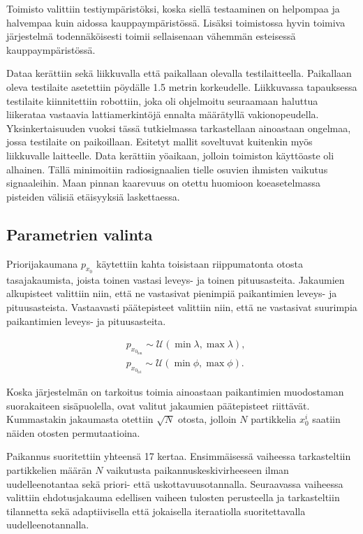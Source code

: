 \documentclass[
  12pt,
  a4paper, twoside]{book}
\begin{document}
\noindent Toimisto valittiin testiympäristöksi, koska siellä testaaminen on helpompaa ja halvempaa kuin aidossa kauppaympäristössä. Lisäksi toimistossa hyvin toimiva järjestelmä todennäköisesti toimii sellaisenaan vähemmän esteisessä kauppaympäristössä.

Dataa kerättiin sekä liikkuvalla että paikallaan olevalla testilaitteella. Paikallaan oleva testilaite asetettiin pöydälle 1.5 metrin korkeudelle. Liikkuvassa tapauksessa testilaite kiinnitettiin robottiin, joka oli ohjelmoitu seuraamaan haluttua liikerataa vastaavia lattiamerkintöjä ennalta määrätyllä vakionopeudella. Yksinkertaisuuden vuoksi tässä tutkielmassa tarkastellaan ainoastaan ongelmaa, jossa testilaite on paikoillaan. Esitetyt mallit soveltuvat kuitenkin myös liikkuvalle laitteelle. Data kerättiin yöaikaan, jolloin toimiston käyttöaste oli alhainen. Tällä minimoitiin radiosignaalien tielle osuvien ihmisten vaikutus signaaleihin. Maan pinnan kaarevuus on otettu huomioon koeasetelmassa pisteiden välisiä etäisyyksiä laskettaessa.

\subsection{Parametrien valinta}

Priorijakaumana \(p_{x_0}\) käytettiin kahta toisistaan riippumatonta otosta tasajakaumista, joista toinen vastasi leveys- ja toinen pituusasteita. Jakaumien alkupisteet valittiin niin, että ne vastasivat pienimpiä paikantimien leveys- ja pituusasteista. Vastaavasti päätepisteet valittiin niin, että ne vastasivat suurimpia paikantimien leveys- ja pituusasteita.

\begin{align}
&p_{x_{0_{\text{lon}}}}\sim\mathcal{U}(\min{\lambda},\max{\lambda}),\\
&p_{x_{0_{\text{lat}}}}\sim\mathcal{U}(\min{\phi},\max{\phi}).
\end{align}

\noindent Koska järjestelmän on tarkoitus toimia ainoastaan paikantimien muodostaman suorakaiteen sisäpuolella, ovat valitut jakaumien päätepisteet riittävät. Kummastakin jakaumasta otettiin \(\sqrt{N}\) otosta, jolloin \(N\) partikkelia \(x^i_0\) saatiin näiden otosten permutaatioina.

Paikannus suoritettiin yhteensä 17 kertaa. Ensimmäisessä vaiheessa tarkasteltiin partikkelien määrän \(N\) vaikutusta paikannuskeskivirheeseen ilman uudelleenotantaa sekä priori- että uskottavuusotannalla. Seuraavassa vaiheessa valittiin ehdotusjakauma edellisen vaiheen tulosten perusteella ja tarkasteltiin tilannetta sekä adaptiivisella että jokaisella iteraatiolla suoritettavalla uudelleenotannalla.
\end{document}
